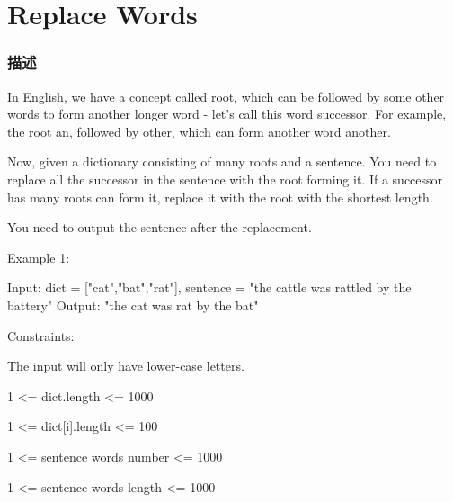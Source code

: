 \section{Replace Words} %
\label{sec:replace-words}


\subsubsection{描述}
In English, we have a concept called root, which can be followed by some other words to form another longer word - let's call this word successor. For example, the root an, followed by other, which can form another word another.

Now, given a dictionary consisting of many roots and a sentence. You need to replace all the successor in the sentence with the root forming it. If a successor has many roots can form it, replace it with the root with the shortest length.

You need to output the sentence after the replacement.

Example 1:
\begin{Code}
Input: dict = ["cat","bat","rat"], sentence = "the cattle was rattled by the battery"
Output: "the cat was rat by the bat"
\end{Code}

Constraints:
\begindot
\item The input will only have lower-case letters.
\item 1 <= dict.length <= 1000
\item 1 <= dict[i].length <= 100
\item 1 <= sentence words number <= 1000
\item 1 <= sentence words length <= 1000
\myenddot


